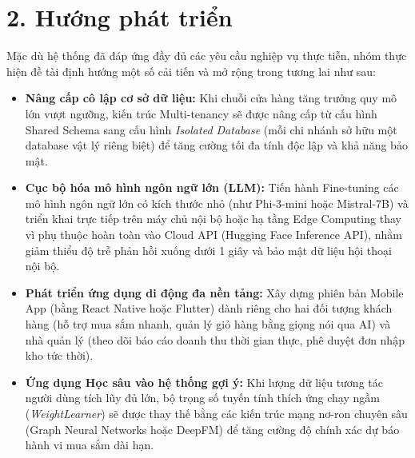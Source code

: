 \documentclass[12pt,a4paper]{report}
\begin{document}
\section*{2. Hướng phát triển}
Mặc dù hệ thống đã đáp ứng đầy đủ các yêu cầu nghiệp vụ thực tiễn, nhóm thực hiện đề tài định hướng một số cải tiến và mở rộng trong tương lai như sau:

\begin{itemize}[leftmargin=*]
    \item \textbf{Nâng cấp cô lập cơ sở dữ liệu:} Khi chuỗi cửa hàng tăng trưởng quy mô lớn vượt ngưỡng, kiến trúc Multi-tenancy sẽ được nâng cấp từ cấu hình Shared Schema sang cấu hình \textit{Isolated Database} (mỗi chi nhánh sở hữu một database vật lý riêng biệt) để tăng cường tối đa tính độc lập và khả năng bảo mật.
    \item \textbf{Cục bộ hóa mô hình ngôn ngữ lớn (LLM):} Tiến hành Fine-tuning các mô hình ngôn ngữ lớn có kích thước nhỏ (như Phi-3-mini hoặc Mistral-7B) và triển khai trực tiếp trên máy chủ nội bộ hoặc hạ tầng Edge Computing thay vì phụ thuộc hoàn toàn vào Cloud API (Hugging Face Inference API), nhằm giảm thiểu độ trễ phản hồi xuống dưới 1 giây và bảo mật dữ liệu hội thoại nội bộ.
    \item \textbf{Phát triển ứng dụng di động đa nền tảng:} Xây dựng phiên bản Mobile App (bằng React Native hoặc Flutter) dành riêng cho hai đối tượng khách hàng (hỗ trợ mua sắm nhanh, quản lý giỏ hàng bằng giọng nói qua AI) và nhà quản lý (theo dõi báo cáo doanh thu thời gian thực, phê duyệt đơn nhập kho tức thời).
    \item \textbf{Ứng dụng Học sâu vào hệ thống gợi ý:} Khi lượng dữ liệu tương tác người dùng tích lũy đủ lớn, bộ trọng số tuyến tính thích ứng chạy ngầm (\textit{WeightLearner}) sẽ được thay thế bằng các kiến trúc mạng nơ-ron chuyên sâu (Graph Neural Networks hoặc DeepFM) để tăng cường độ chính xác dự báo hành vi mua sắm dài hạn.
\end{itemize}

\newpage
\end{document}
